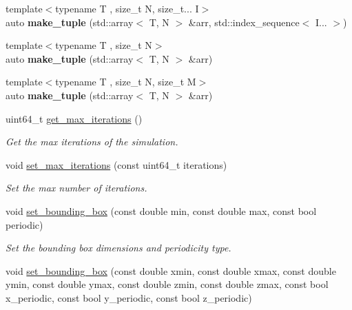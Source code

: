 \begin{DoxyCompactItemize}
\mbox{\label{namespacewash_ae34701c709b5a3bace6dfc0e19dcf01b}} 
{\footnotesize template$<$typename T , size\+\_\+t N, size\+\_\+t... I$>$ }\\auto {\bfseries make\+\_\+tuple} (std\+::array$<$ T, N $>$ \&arr, std\+::index\+\_\+sequence$<$ I... $>$)
\item 
\mbox{\label{namespacewash_a22d9c927a5c59b8a587e335472411ae7}} 
{\footnotesize template$<$typename T , size\+\_\+t N$>$ }\\auto {\bfseries make\+\_\+tuple} (std\+::array$<$ T, N $>$ \&arr)
\item 
\mbox{\label{namespacewash_a477322dfaa4429578d544d713f5d4df9}} 
{\footnotesize template$<$typename T , size\+\_\+t N, size\+\_\+t M$>$ }\\auto {\bfseries make\+\_\+tuple} (std\+::array$<$ T, N $>$ \&arr)
\item 
uint64\+\_\+t \mbox{\hyperlink{namespacewash_ab59a4fff607c38a8cded277413cdafec}{get\+\_\+max\+\_\+iterations}} ()
\begin{DoxyCompactList}\small\item\em Get the max iterations of the simulation. \end{DoxyCompactList}\item 
void \mbox{\hyperlink{namespacewash_aeb7b287406244c8ab192d0524ad4da5b}{set\+\_\+max\+\_\+iterations}} (const uint64\+\_\+t iterations)
\begin{DoxyCompactList}\small\item\em Set the max number of iterations. \end{DoxyCompactList}\item 
void \mbox{\hyperlink{namespacewash_a24bef1df5fe5c24cd518f12885a51055}{set\+\_\+bounding\+\_\+box}} (const double min, const double max, const bool periodic)
\begin{DoxyCompactList}\small\item\em Set the bounding box dimensions and periodicity type. \end{DoxyCompactList}\item 
\mbox{\label{namespacewash_a70aeb215881f159a7efb6da02e5e452b}} 
void \mbox{\hyperlink{namespacewash_a70aeb215881f159a7efb6da02e5e452b}{set\+\_\+bounding\+\_\+box}} (const double xmin, const double xmax, const double ymin, const double ymax, const double zmin, const double zmax, const bool x\+\_\+periodic, const bool y\+\_\+periodic, const bool z\+\_\+periodic)

\end{DoxyCompactItemize}
